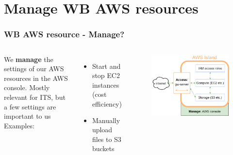 \documentclass[aspectratio=169]{beamer} %
\begin{document}
\section{Manage WB AWS resources}

\begin{frame}
	\frametitle{WB AWS resource - Manage?}
	\begin{columns}[c]
		We \textbf{manage} the settings of our AWS resources in the AWS console. 
		\vspace{.5cm}\newline
		Mostly relevant for ITS, but a few settings are important to us
		\vspace{.5cm}\newline
		Examples:
		\begin{itemize}
			\item Start and stop EC2 instances (cost efficiency)
			\item Manually upload files to S3 buckets
		\end{itemize}
		
		\begin{figure}
			\centering
			\includegraphics[width=\textwidth]{./img/wb-aws.png}
		\end{figure}
		
	\end{columns}
\end{frame}
\end{document}
